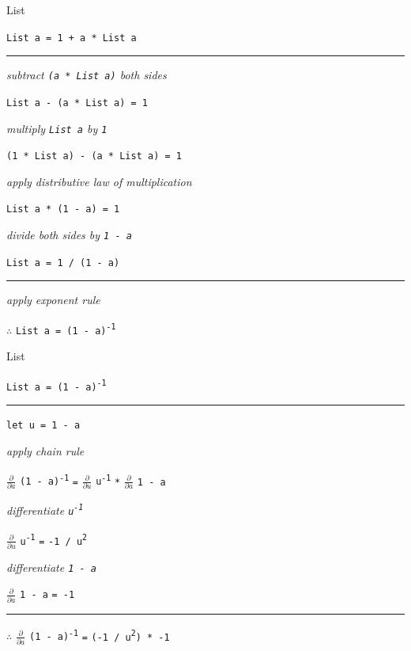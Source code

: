 \begin{frame}{List}

\lstinline{List a = 1 + a * List a}

\par\noindent\rule{\textwidth}{0.4pt}

\emph{\tiny{subtract \lstinline{(a * List a)} both sides}}

\lstinline{List a - (a * List a) = 1}

\emph{\tiny{multiply \lstinline{List a} by \lstinline{1}}}

\lstinline{(1 * List a) - (a * List a) = 1}

\emph{\tiny{apply distributive law of multiplication}}

\lstinline{List a * (1 - a) = 1}

\emph{\tiny{divide both sides by \lstinline{1 - a}}}

\lstinline{List a = 1 / (1 - a)}

\par\noindent\rule{\textwidth}{0.4pt}

\emph{\tiny{apply exponent rule}}

{$\therefore$} \lstinline{List a = (1 - a)}\textsuperscript{\lstinline{-1}}

\end{frame}


\begin{frame}{List}

\lstinline{List a = (1 - a)}\textsuperscript{\lstinline{-1}}

\par\noindent\rule{\textwidth}{0.4pt}

\lstinline{let u = 1 - a}

\emph{\tiny{apply chain rule}}

$\frac{\partial}{\partial a}$ {\lstinline{(1 - a)}\textsuperscript{\lstinline{-1}}} \lstinline{=} $\frac{\partial}{\partial u}$ {\lstinline{u}\textsuperscript{\lstinline{-1}}} \lstinline{*} $\frac{\partial}{\partial a}$ \lstinline{1 - a}

\emph{\tiny{differentiate \lstinline{u}\textsuperscript{\lstinline{-1}}}}

$\frac{\partial}{\partial u}$ \lstinline{u}\textsuperscript{\lstinline{-1}} \lstinline{=} \lstinline{-1 / u}\textsuperscript{\lstinline{2}}

\emph{\tiny{differentiate \lstinline{1 - a}}}

$\frac{\partial}{\partial a}$ \lstinline{1 - a} \lstinline{= -1} 

\par\noindent\rule{\textwidth}{0.4pt}

{$\therefore$} $\frac{\partial}{\partial a}$ {\lstinline{(1 - a)}\textsuperscript{\lstinline{-1}}} \lstinline{=} \lstinline{(-1 / u}\textsuperscript{\lstinline{2}}\lstinline{) * -1}

\end{frame}


